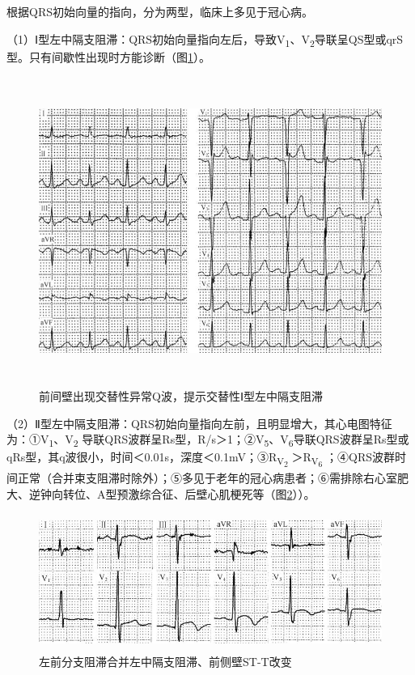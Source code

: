 根据QRS初始向量的指向，分为两型，临床上多见于冠心病。

（1）Ⅰ型左中隔支阻滞：QRS初始向量指向左后，导致V\textsubscript{1}、V\textsubscript{2}导联呈QS型或qrS型。只有间歇性出现时方能诊断（图\ref{fig21-9}）。

\begin{figure}[!htbp]
 \centering
 \includegraphics[width=5.58333in,height=3.96875in]{./images/Image00357.jpg}
 \captionsetup{justification=centering}
 \caption{前间壁出现交替性异常Q波，提示交替性Ⅰ型左中隔支阻滞}
 \label{fig21-9}
  \end{figure} 

（2）Ⅱ型左中隔支阻滞：QRS初始向量指向左前，且明显增大，其心电图特征为：①V\textsubscript{1}、V\textsubscript{2} 导联QRS波群呈Rs型，R/s＞1；②V\textsubscript{5}、V\textsubscript{6}导联QRS波群呈Rs型或qRs型，其q波很小，时间＜0.01s，深度＜0.1mV；③R\textsubscript{V\textsubscript{2}}
＞R\textsubscript{V\textsubscript{6}}
；④QRS波群时间正常（合并束支阻滞时除外）；⑤多见于老年的冠心病患者；⑥需排除右心室肥大、逆钟向转位、A型预激综合征、后壁心肌梗死等（图\ref{fig21-10}））。

\begin{figure}[!htbp]
 \centering
 \includegraphics[width=4.89583in,height=1.76042in]{./images/Image00358.jpg}
 \captionsetup{justification=centering}
 \caption{左前分支阻滞合并左中隔支阻滞、前侧壁ST-T改变}
 \label{fig21-10}
  \end{figure} 

